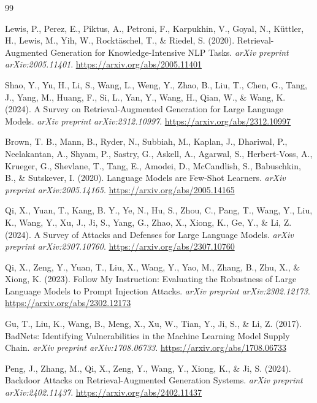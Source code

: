 \documentclass[12pt, a4paper]{article}
\theoremstyle{definition}
\theoremstyle{remark}
\begin{document}
\begin{thebibliography}{99}

Lewis, P., Perez, E., Piktus, A., Petroni, F., Karpukhin, V., Goyal, N., Küttler, H., Lewis, M., Yih, W., Rocktäschel, T., \& Riedel, S. (2020). Retrieval-Augmented Generation for Knowledge-Intensive NLP Tasks. \textit{arXiv preprint arXiv:2005.11401}.
\url{https://arxiv.org/abs/2005.11401}

Shao, Y., Yu, H., Li, S., Wang, L., Weng, Y., Zhao, B., Liu, T., Chen, G., Tang, J., Yang, M., Huang, F., Si, L., Yan, Y., Wang, H., Qian, W., \& Wang, K. (2024). A Survey on Retrieval-Augmented Generation for Large Language Models. \textit{arXiv preprint arXiv:2312.10997}.
\url{https://arxiv.org/abs/2312.10997}

Brown, T. B., Mann, B., Ryder, N., Subbiah, M., Kaplan, J., Dhariwal, P., Neelakantan, A., Shyam, P., Sastry, G., Askell, A., Agarwal, S., Herbert-Voss, A., Krueger, G., Shevlane, T., Tang, E., Amodei, D., McCandlish, S., Babuschkin, B., \& Sutskever, I. (2020). Language Models are Few-Shot Learners. \textit{arXiv preprint arXiv:2005.14165}.
\url{https://arxiv.org/abs/2005.14165}

Qi, X., Yuan, T., Kang, B. Y., Ye, N., Hu, S., Zhou, C., Pang, T., Wang, Y., Liu, K., Wang, Y., Xu, J., Ji, S., Yang, G., Zhao, X., Xiong, K., Ge, Y., \& Li, Z. (2024). A Survey of Attacks and Defenses for Large Language Models. \textit{arXiv preprint arXiv:2307.10760}.
\url{https://arxiv.org/abs/2307.10760}

Qi, X., Zeng, Y., Yuan, T., Liu, X., Wang, Y., Yao, M., Zhang, B., Zhu, X., \& Xiong, K. (2023). Follow My Instruction: Evaluating the Robustness of Large Language Models to Prompt Injection Attacks. \textit{arXiv preprint arXiv:2302.12173}.
\url{https://arxiv.org/abs/2302.12173}

Gu, T., Liu, K., Wang, B., Meng, X., Xu, W., Tian, Y., Ji, S., \& Li, Z. (2017). BadNets: Identifying Vulnerabilities in the Machine Learning Model Supply Chain. \textit{arXiv preprint arXiv:1708.06733}.
\url{https://arxiv.org/abs/1708.06733}

Peng, J., Zhang, M., Qi, X., Zeng, Y., Wang, Y., Xiong, K., \& Ji, S. (2024). Backdoor Attacks on Retrieval-Augmented Generation Systems. \textit{arXiv preprint arXiv:2402.11437}.
\url{https://arxiv.org/abs/2402.11437}


\end{thebibliography}
\end{document}
